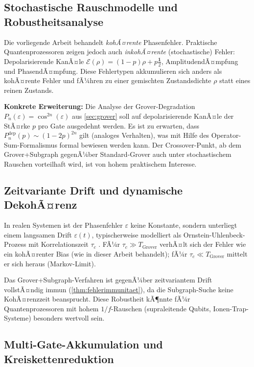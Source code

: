 ﻿\documentclass[11pt,a4paper]{article}
\theoremstyle{definition}
\begin{document}
\subsection{Stochastische Rauschmodelle und Robustheitsanalyse}
\label{subsec:outlook_stoch}

Die vorliegende Arbeit behandelt \emph{kohÃ¤rente} Phasenfehler.  Praktische
Quantenprozessoren zeigen jedoch auch \emph{inkohÃ¤rente} (stochastische) Fehler:
Depolarisierende KanÃ¤le $\mathcal{E}(\rho) = (1-p)\rho + p\tfrac{\mathbf{1}}{2}$,
AmplitudendÃ¤mpfung und PhasendÃ¤mpfung.  Diese Fehlertypen akkumulieren sich
anders als kohÃ¤rente Fehler und fÃ¼hren zu einer gemischten Zustandsdichte $\rho$
statt eines reinen Zustands.

\textbf{Konkrete Erweiterung:}  Die Analyse der Grover-Degradation
$P_n(\varepsilon) = \cos^{2n}(\varepsilon)$ aus \cref{sec:grover} soll auf
depolarisierende KanÃ¤le der StÃ¤rke $p$ pro Gate ausgedehnt werden.
Es ist zu erwarten, dass $P_n^{\mathrm{dep}}(p) \sim (1-2p)^{2n}$ gilt
(analoges Verhalten), was mit Hilfe des Operator-Sum-Formalismus
\cite{Nielsen2000} formal bewiesen werden kann.  Der Crossover-Punkt, ab dem
Grover+Subgraph gegenÃ¼ber Standard-Grover auch unter stochastischem Rauschen
vorteilhaft wird, ist von hohem praktischem Interesse.

\subsection{Zeitvariante Drift und dynamische DekohÃ¤renz}
\label{subsec:outlook_drift}

In realen Systemen ist der Phasenfehler $\varepsilon$ keine Konstante, sondern
unterliegt einem langsamen Drift $\varepsilon(t)$, typischerweise modelliert
als Ornstein-Uhlenbeck-Prozess mit Korrelationszeit $\tau_c$ \cite{Bylander2011}.
FÃ¼r $\tau_c \gg T_{\mathrm{Grover}}$ verhÃ¤lt sich der Fehler wie ein
kohÃ¤renter Bias (wie in dieser Arbeit behandelt); fÃ¼r $\tau_c \ll T_{\mathrm{Grover}}$
mittelt er sich heraus (Markov-Limit).

Das Grover+Subgraph-Verfahren ist gegenÃ¼ber zeitvariantem Drift vollstÃ¤ndig
immun (\cref{thm:fehlerimmunitaet}), da die Subgraph-Suche keine KohÃ¤renzzeit
beansprucht.  Diese Robustheit kÃ¶nnte fÃ¼r Quantenprozessoren mit hohem
$1/f$-Rauschen (supraleitende Qubits, Ionen-Trap-Systeme) besonders wertvoll sein.

\subsection{Multi-Gate-Akkumulation und Kreiskettenreduktion}
\label{subsec:outlook_multigate}
\end{document}
